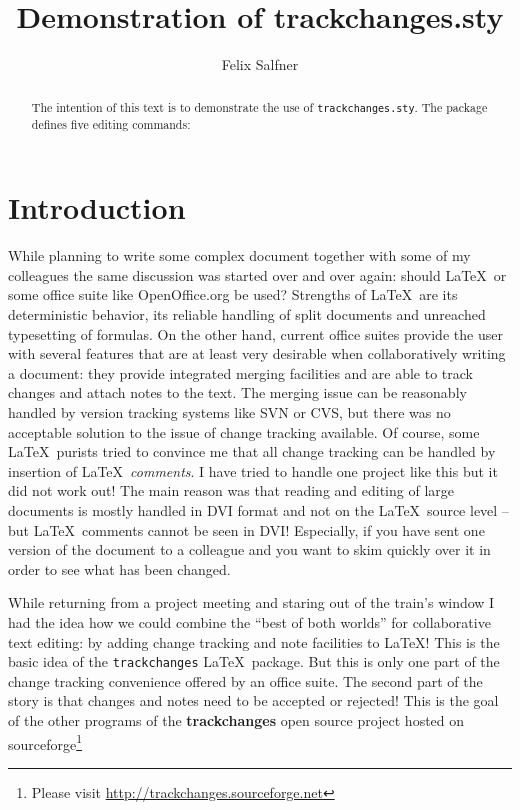 \documentclass[a4paper,10pt]{article}
\begin{document}
\title{Demonstration of trackchanges.sty}
\author{Felix Salfner}

\maketitle

\begin{abstract} \noindent The intention of this text is to demonstrate the use of \texttt{trackchanges.sty}. The package defines five editing commands:
\end{abstract}

\section{Introduction}

While planning to write some complex document together with some of my colleagues the same discussion was started over and over again: should \LaTeX\ or some office suite like OpenOffice.org be used? Strengths of \LaTeX\ are its deterministic behavior, its reliable handling of split documents and unreached typesetting of formulas. On the other hand, current office suites provide the user with several features that are at least very desirable when collaboratively writing a document: they provide integrated merging facilities and are able to track changes and attach notes to the text. The merging issue can be reasonably handled by version tracking systems like SVN or CVS, but there was no acceptable solution to the issue of change tracking available. Of course, some  \LaTeX\ purists tried to convince me that all change tracking can be handled by insertion of \LaTeX\ \textit{comments}. I have tried to handle one project like this but it did not work out! The main reason was that reading and editing of large documents is mostly handled in DVI format and not on the \LaTeX\ source level -- but \LaTeX\ comments cannot be seen in DVI! Especially, if you have sent one version of the document to a colleague and you want to skim quickly over it in order to see what has been changed.

While returning from a project meeting and staring out of the train's window I had the idea how we could combine the ``best of both worlds'' for collaborative text editing: by adding change tracking and note facilities to \LaTeX ! This is the basic idea of the \texttt{trackchanges} \LaTeX\ package. But this is only one part of the change tracking convenience offered by an office suite. The second part of the story is that changes and notes need to be accepted or rejected! This is the goal of the other programs of the \textbf{trackchanges} open source project hosted on sourceforge\footnote{Please visit  \url{http://trackchanges.sourceforge.net}}
\end{document}
